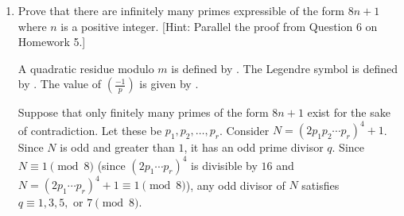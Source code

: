 \begin{enumerate}
\begin{enumerate}
\begin{subprove}
      Since $x^4 \equiv -1 \pmod{p}$, it follows that $x^8 \equiv 1 \pmod{p}$.
      By , the order of $x$ modulo $p$ divides $8$.
      Since $x^4 \equiv -1 \not\equiv 1 \pmod{p}$, the order of $x$ modulo $p$ does not divide $4$.
      Therefore, the order of $x$ modulo $p$ is exactly $8$.
      Since the order of $x$ modulo $p$ divides $\varphi(p) = p-1$ by , it follows that $8 \mid p-1$.
      Therefore, $p \equiv 1 \pmod{8}$.
      
      ($\Leftarrow$) Suppose $p \equiv 1 \pmod{8}$ for the sake of direct proof.
      It is shown that $x^4 \equiv -1 \pmod{p}$ is solvable.
      Since $p \equiv 1 \pmod{8}$, there exists a primitive root $g$ modulo $p$ by .
      Since $8 \mid p-1$, let $h = g^{(p-1)/8}$.
      Then $h^8 = g^{p-1} \equiv 1 \pmod{p}$ by .
      Since $g$ is a primitive root modulo $p$, by , the order of $g$ modulo $p$ is $\varphi(p) = p-1$.
      Therefore, the order of $h = g^{(p-1)/8}$ modulo $p$ is exactly $8$ (since if the order were a proper divisor $d$ of $8$, then $g^{(p-1)/8 \cdot d} \equiv 1 \pmod{p}$, which would imply the order of $g$ divides $(p-1)/8 \cdot d < p-1$, a contradiction).
      Since the order of $h$ modulo $p$ is $8$ and $h^8 \equiv 1 \pmod{p}$, it follows that $h^4 \not\equiv 1 \pmod{p}$ (otherwise the order would divide $4$).
      Since $(h^4)^2 = h^8 \equiv 1 \pmod{p}$ and $h^4 \not\equiv 1 \pmod{p}$, it follows that $h^4 \equiv -1 \pmod{p}$.
      Therefore, $x = h$ is a solution to $x^4 \equiv -1 \pmod{p}$.
      
      Therefore, by ($\Rightarrow$) and ($\Leftarrow$), the congruence $x^4 \equiv -1 \pmod{p}$ is solvable if and only if $p \equiv 1 \pmod{8}$.
    \end{subprove}
    
    \item Prove that there are infinitely many primes expressible of the form $8n+1$ where $n$ is a positive integer.
    [Hint: Parallel the proof from Question 6 on Homework 5.]
    \begin{subprove}
      A quadratic residue modulo $m$ is defined by .
      The Legendre symbol is defined by .
      The value of $\left(\frac{-1}{p}\right)$ is given by .
      
      Suppose that only finitely many primes of the form $8n+1$ exist for the sake of contradiction.
      Let these be $p_1, p_2, \ldots, p_r$. Consider $N = (2p_1p_2\cdots p_r)^4 + 1$.
      Since $N$ is odd and greater than $1$, it has an odd prime divisor $q$.
      Since $N \equiv 1 \pmod{8}$ (since $(2p_1\cdots p_r)^4$ is divisible by $16$ and $N = (2p_1\cdots p_r)^4 + 1 \equiv 1 \pmod{8}$), any odd divisor of $N$ satisfies $q \equiv 1, 3, 5, \text{ or } 7 \pmod{8}$.
      

\end{subprove}
\end{enumerate}
\end{enumerate}
